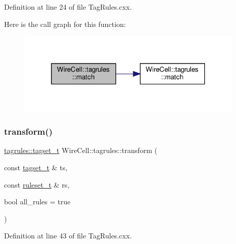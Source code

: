 Definition at line 24 of file Tag\+Rules.\+cxx.

Here is the call graph for this function\+:
\nopagebreak
\begin{figure}[H]
\begin{center}
\leavevmode
\includegraphics[width=306pt]{namespace_wire_cell_1_1tagrules_a307c2349fd136058ba33924faff92553_cgraph}
\end{center}
\end{figure}
\mbox{\label{namespace_wire_cell_1_1tagrules_a8e7dac6e5d8aa67bbe4c801a1738d170}} 
\subsubsection{\texorpdfstring{transform()}{transform()}}
{\footnotesize\ttfamily \hyperlink{namespace_wire_cell_1_1tagrules_a80263165e3d13e49e317c045829f76cb}{tagrules\+::tagset\+\_\+t} Wire\+Cell\+::tagrules\+::transform (\begin{DoxyParamCaption}\item[{const \hyperlink{namespace_wire_cell_1_1tagrules_a80263165e3d13e49e317c045829f76cb}{tagset\+\_\+t} \&}]{ts,  }\item[{const \hyperlink{namespace_wire_cell_1_1tagrules_a93f5672d7c60d5f990b42dd93fd0aee2}{ruleset\+\_\+t} \&}]{rs,  }\item[{bool}]{all\+\_\+rules = {\ttfamily true} }\end{DoxyParamCaption})}



Definition at line 43 of file Tag\+Rules.\+cxx.

